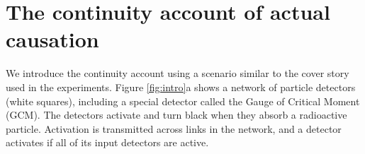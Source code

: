 \documentclass[10pt,letterpaper]{article}
\begin{document}


% 

\section{The continuity account of actual causation}

We introduce the continuity account using a scenario similar to the cover story used in the experiments. Figure \ref{fig:intro}a shows a network of particle detectors (white squares), including a special detector called the Gauge of Critical Moment (GCM). The detectors activate and turn black when they absorb a radioactive particle.  Activation is transmitted across links in the network, and a detector activates if all of its input detectors are active. 
\end{document}
